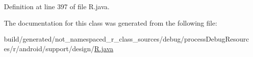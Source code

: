 Definition at line 397 of file R.\+java.



The documentation for this class was generated from the following file\+:\begin{DoxyCompactItemize}
\item 
build/generated/not\+\_\+namespaced\+\_\+r\+\_\+class\+\_\+sources/debug/process\+Debug\+Resources/r/android/support/design/\mbox{\hyperlink{android_2support_2design_2_r_8java}{R.\+java}}\end{DoxyCompactItemize}
